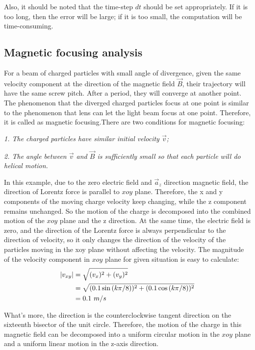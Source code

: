 \documentclass[journal,twocolumn,letterpaper]{IEEEJERM}
\begin{document}
Also, it should be noted that the time-step $ dt $ should be set appropriately. If it is too long, then the error will be large; if it is too small, the computation will be time-consuming.

\subsection{Magnetic focusing analysis }
For a beam of charged particles with small angle of divergence, given the same velocity component at the direction of the magnetic field $ \vec{B} $, their trajectory will have the same screw pitch. After a period, they will converge at another point. The phenomenon that the diverged charged particles focus at one point is similar to the phenomenon that lens can let the light beam focus at one point. Therefore, it is called as magnetic focusing.There are two conditions for magnetic focusing: 

\textit{1. The charged particles have similar initial velocity $\vec{v} $;}

\textit{2. The angle between $ \vec{v} $ and $ \vec{B} $ is sufficiently small so that each particle will do helical motion.}

In this example, due to the zero electric field and $ \vec{a}_z $ direction magnetic field, the direction of Lorentz force is parallel to $ xoy $ plane.  Therefore, the x and y components of the moving charge velocity keep changing, while the z component remains unchanged. So the motion of the charge is decomposed into the combined motion of the $ xoy $ plane and the z direction. At the same time, the electric field is zero, and the direction of the Lorentz force is always perpendicular to the direction of velocity, so it only changes the direction of the velocity of the particles moving in the xoy plane without affecting the velocity. The magnitude of the  velocity component in $ xoy $ plane for given situation is easy to calculate:
\begin{align}
|{v}_{xy}|&=\sqrt{(v_x)^2+(v_y)^2} \\
&=\sqrt{(0.1\sin{(k\pi/8)})^2+(0.1\cos{(k\pi/8)})^2    }\notag \\ 
&=0.1\ m/s\notag
\end{align}

What's more, the direction is the counterclockwise tangent direction on the sixteenth bisector of the unit circle. Therefore, the motion of the charge in this magnetic field can be decomposed into a uniform circular motion in the $ xoy $ plane and a uniform linear motion in the z-axis direction.
\end{document}

